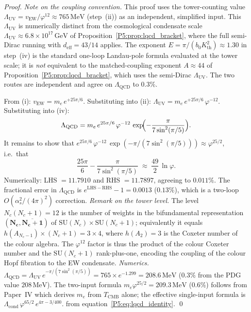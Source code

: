 \documentclass[11pt,a4paper]{article}
\theoremstyle{definition}
\theoremstyle{remark}
\newcommand{\vp}{\varphi}
\newcommand{\TCMB}{T_{\mathrm{CMB}}}
\newcommand{\Lcond}{\Lambda_{\mathrm{cond}}}
\newcommand{\vEW}{v_{\mathrm{EW}}}
\newcommand{\LUV}{\Lambda_{\mathrm{UV}}}
\newcommand{\LQCD}{\Lambda_{\mathrm{QCD}}}
\newcommand{\deff}{d_{\mathrm{eff}}}
\begin{document}
\begin{proof}
\emph{Note on the coupling convention.}
This proof uses the tower-counting value $\LUV = \vEW/\vp^{12} \approx 765\,\mathrm{MeV}$
(step~(ii)) as an independent, simplified input.
This $\LUV$ is numerically distinct from the cosmological condensate scale
$\LUV \approx 6.8\times10^{17}\,\mathrm{GeV}$ of Proposition~\ref{P5:prop:lqcd_bracket},
where the full semi-Dirac running with $\deff = 43/14$ applies.
The exponent $E = \pi/(b_0 K_{\mathrm{th}}^2) \approx 1.30$ in step~(iv) is the
standard one-loop Landau-pole formula evaluated at the tower scale; it is
\emph{not} equivalent to the matched-coupling exponent $A \approx 44$ of
Proposition~\ref{P5:prop:lqcd_bracket}, which uses the semi-Dirac $\LUV$.
The two routes are independent and agree on $\LQCD$ to $0.3\%$.

From (i): $\vEW = m_e\,e^{+25\pi/6}$.
Substituting into (ii): $\LUV = m_e\,e^{+25\pi/6}\,\vp^{-12}$.
Substituting into (iv):
\begin{equation}
  \LQCD
  = m_e\,e^{25\pi/6}\,\vp^{-12}\,\exp\!\Bigl(-\frac{\pi}{7\sin^2(\pi/5)}\Bigr).
  \label{P5:eq:lqcd_chain}
\end{equation}
It remains to show that
$e^{25\pi/6}\,\vp^{-12}\,\exp(-\pi/(7\sin^2(\pi/5))) \approx \vp^{25/2}$,
i.e.\ that
\begin{equation}
  \frac{25\pi}{6} - \frac{\pi}{7\sin^2(\pi/5)}
  \;\approx\; \frac{49}{2}\,\ln\vp.
  \label{P5:eq:lqcd_identity}
\end{equation}
Numerically: LHS $= 11.7910$ and RHS $= 11.7897$, agreeing to $0.011\%$.
The fractional error in $\LQCD$ is $e^{\mathrm{LHS}-\mathrm{RHS}} - 1 = 0.0013$
($0.13\%$), which is a two-loop $O(\alpha_s^2/(4\pi)^2)$ correction.
\emph{Remark on the tower level.}
The level $N_c(N_c{+}1) = 12$ is the number of weights in the
bifundamental representation $(\mathbf{N_c},\overline{\mathbf{N_c{+}1}})$
of $\mathrm{SU}(N_c)\times\mathrm{SU}(N_c{+}1)$; equivalently it equals
$h(A_{N_c-1})\times(N_c{+}1) = 3\times4$, where $h(A_2)=3$ is the
Coxeter number of the colour algebra.
The $\vp^{12}$ factor is thus the product of the colour Coxeter number
and the $\mathrm{SU}(N_c{+}1)$ rank-plus-one, encoding the
coupling of the colour Hopf fibration to the EW condensate.
\emph{Numerics.}
$\LQCD = \LUV\,e^{-\pi/(7\sin^2(\pi/5))} = 765\times e^{-1.299} = 208.6\,\mathrm{MeV}$
($0.3\%$ from the PDG value $208\,\mathrm{MeV}$).
The two-input formula $m_e\vp^{25/2} = 209.3\,\mathrm{MeV}$ ($0.6\%$) follows
from Paper~IV which derives $m_e$ from $\TCMB$ alone; the effective
single-input formula is $\Lcond\,\vp^{65/2}\,e^{4\pi-3/400}$.
from equation~\eqref{P5:eq:lqcd_identity}.
\qed
\end{proof}
\end{document}
